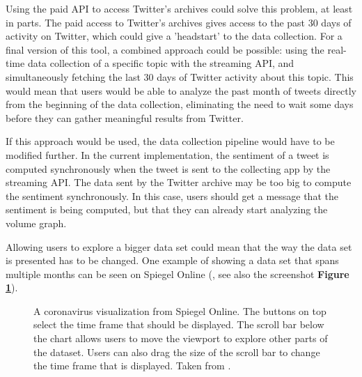 Using the paid API to access Twitter's archives could solve this problem, at least in parts. The paid access to Twitter's archives gives access to the past 30 days of activity on Twitter, which could give a 'headstart' to the data collection. For a final version of this tool, a combined approach could be possible: using the real-time data collection of a specific topic with the streaming API, and simultaneously fetching the last 30 days of Twitter activity about this topic. This would mean that users would be able to analyze the past month of tweets directly from the beginning of the data collection, eliminating the need to wait some days before they can gather meaningful results from Twitter.

If this approach would be used, the data collection pipeline would have to be modified further. In the current implementation, the sentiment of a tweet is computed synchronously when the tweet is sent to the collecting app by the streaming API. The data sent by the Twitter archive may be too big to compute the sentiment synchronously. In this case, users should get a message that the sentiment is being computed, but that they can already start analyzing the volume graph.

Allowing users to explore a bigger data set could mean that the way the data set is presented has to be changed. One example of showing a data set that spans multiple months can be seen on Spiegel Online (\cite{merlotCoronavirusBrasilienManaus2020}, see also the screenshot \textbf{Figure \ref{fig:spiegel_visualization}}).

\begin{figure}[htb!]
    \caption{A coronavirus visualization from Spiegel Online. The buttons on top select the time frame that should be displayed. The scroll bar below the chart allows users to move the viewport to explore other parts of the dataset. Users can also drag the size of the scroll bar to change the time frame that is displayed. Taken from \cite{merlotCoronavirusBrasilienManaus2020}.}
    \label{fig:spiegel_visualization}
\end{figure}

